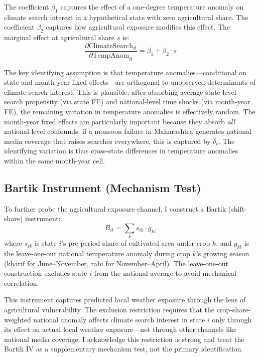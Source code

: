 \documentclass[12pt]{article}
\begin{document}
The coefficient $\beta_1$ captures the effect of a one-degree temperature anomaly on climate search interest in a hypothetical state with zero agricultural share. The coefficient $\beta_2$ captures how agricultural exposure modifies this effect. The marginal effect at agricultural share $s$ is:
\begin{equation}
\frac{\partial \text{ClimateSearch}_{it}}{\partial \text{TempAnom}_{it}} = \beta_1 + \beta_2 \cdot s
\end{equation}

The key identifying assumption is that temperature anomalies---conditional on state and month-year fixed effects---are orthogonal to unobserved determinants of climate search interest. This is plausible: after absorbing average state-level search propensity (via state FE) and national-level time shocks (via month-year FE), the remaining variation in temperature anomalies is effectively random. The month-year fixed effects are particularly important because they absorb \textit{all} national-level confounds: if a monsoon failure in Maharashtra generates national media coverage that raises searches everywhere, this is captured by $\delta_t$. The identifying variation is thus cross-state differences in temperature anomalies within the same month-year cell.

\subsection{Bartik Instrument (Mechanism Test)}

To further probe the agricultural exposure channel, I construct a Bartik (shift-share) instrument:
\begin{equation}
B_{it} = \sum_{k} s_{ik} \cdot g_{kt}
\end{equation}
where $s_{ik}$ is state $i$'s pre-period share of cultivated area under crop $k$, and $g_{kt}$ is the leave-one-out national temperature anomaly during crop $k$'s growing season (kharif for June--November, rabi for November--April). The leave-one-out construction excludes state $i$ from the national average to avoid mechanical correlation.

This instrument captures predicted local weather exposure through the lens of agricultural vulnerability. The exclusion restriction requires that the crop-share-weighted national anomaly affects climate search interest in state $i$ only through its effect on actual local weather exposure---not through other channels like national media coverage. I acknowledge this restriction is strong and treat the Bartik IV as a supplementary mechanism test, not the primary identification.
\end{document}
